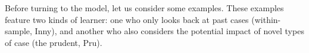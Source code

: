\documentclass[ecta,nameyear,draft]{econsocart}
\makeatletter
\newcommand\ie{i\@.e\@ifnextchar.{}{.\@}}
\newcommand{\gsii}{$\textup{GS03}$}
\theoremstyle{plain}
\theoremstyle{remark}
\makeatother
\begin{document}
%

Before turning to the model, let us consider some examples. These examples
feature two kinds of learner: one who only looks back at past cases
(within-sample, Inny), and another who also considers the potential impact of
novel types of case (the prudent, Pru).

% 
%  
%
\end{document}
